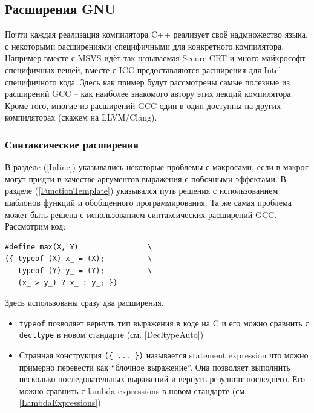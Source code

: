 \documentclass[a4paper,12pt,oneside]{article}
\begin{document}
\subsection{Расширения GNU}\label{GNUExt}

Почти каждая реализация компилятора C++ реализует своё надмножество языка, с некоторыми расширениями специфичными для конкретного компилятора. Например вместе с MSVS идёт так называемая Secure CRT и много майкрософт-специфичных вещей, вместе с ICC предоставляются расширения для Intel-специфичного кода. Здесь как пример будут рассмотрены самые полезные из расширений GCC -- как наиболее знакомого автору этих лекций компилятора. Кроме того, многие из расширений GCC один в один доступны на других компиляторах (скажем на LLVM/Clang).

\subsubsection{Синтаксические расширения}\label{SyntacticExts}

В разделe (\ref{Inline}) указывались некоторые проблемы с макросами, если в макрос могут придти в качестве аргументов выражения с побочными эффектами. В разделе (\ref{FunctionTemplate}) указывался путь решения с использованием шаблонов функций и обобщенного программирования. Та же самая проблема может быть решена с использованием синтаксических расширений GCC. Рассмотрим код:

\begin{lstlisting}
#define max(X, Y)                \
({ typeof (X) x_ = (X);          \
   typeof (Y) y_ = (Y);          \
   (x_ > y_) ? x_ : y_; })
\end{lstlisting}

Здесь использованы сразу два расширения. 

\begin{itemize}
\item \lstinline!typeof! позволяет вернуть тип выражения в коде на C и его можно сравнить с \lstinline!decltype! в новом стандарте (см. \ref{DecltypeAuto})
\item Странная конструкция \lstinline!({ ... })! называется statement expression что можно примерно перевести как ``блочное выражение''. Она позволяет выполнить несколько последовательных выражений и вернуть результат последнего. Его можно сравнить с lambda-expressions в новом стандарте (см. \ref{LambdaExpressions})
\end{itemize}
\end{document}
